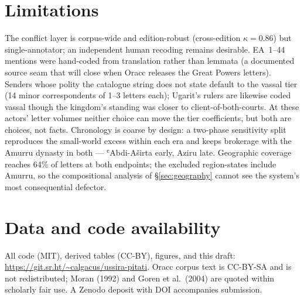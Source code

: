 \documentclass[11pt]{article}
\begin{document}
\section{Limitations}

The conflict layer is corpus-wide and edition-robust (cross-edition
$\kappa=0.86$) but single-annotator; an independent human recoding
remains desirable. EA~1--44 mentions were hand-coded from translation
rather than lemmata (a documented source seam that will close when Oracc
releases the Great Powers letters). Senders whose polity the catalogue
string does not state default to the vassal tier (14 minor
correspondents of 1--3 letters each); Ugarit's rulers are likewise coded
vassal though the kingdom's standing was closer to
client-of-both-courts. At these actors' letter volumes neither choice
can move the tier coefficients, but both are choices, not facts.
Chronology is coarse by design: a two-phase sensitivity split reproduces
the small-world excess within each era and keeps brokerage with the
Amurru dynasty in both --- ʿAbdi-Aširta early, Aziru late. Geographic
coverage reaches 64\% of letters at both endpoints; the excluded
region-states include Amurru, so the compositional analysis of
\S\ref{sec:geography} cannot see the system's most consequential
defector.

\section{Data and code availability}

All code (MIT), derived tables (CC-BY), figures, and this draft:
\url{https://git.sr.ht/~calgacus/ussira-pitati}. Oracc corpus text is
CC-BY-SA \citep{LauingerYoder2025} and is not redistributed; Moran
(1992) and Goren et al.\ (2004) are quoted within scholarly fair use. A
Zenodo deposit with DOI accompanies submission.


\end{document}
